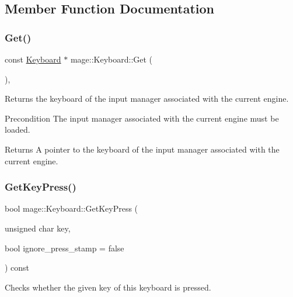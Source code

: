 \subsection{Member Function Documentation}
\hypertarget{classmage_1_1_keyboard_a696032d3a0d9bcf1a677a35e1e3d9aa8}{}\label{classmage_1_1_keyboard_a696032d3a0d9bcf1a677a35e1e3d9aa8} 
\subsubsection{\texorpdfstring{Get()}{Get()}}
{\footnotesize\ttfamily const \hyperlink{classmage_1_1_keyboard}{Keyboard} $\ast$ mage\+::\+Keyboard\+::\+Get (\begin{DoxyParamCaption}{ }\end{DoxyParamCaption})\hspace{0.3cm}{\ttfamily [static]}, {\ttfamily [noexcept]}}

Returns the keyboard of the input manager associated with the current engine.

\begin{DoxyPrecond}{Precondition}
The input manager associated with the current engine must be loaded. 
\end{DoxyPrecond}
\begin{DoxyReturn}{Returns}
A pointer to the keyboard of the input manager associated with the current engine. 
\end{DoxyReturn}
\hypertarget{classmage_1_1_keyboard_a94d35ad5ad27e3fc9496f3ab1fa28e4d}{}\label{classmage_1_1_keyboard_a94d35ad5ad27e3fc9496f3ab1fa28e4d} 
\subsubsection{\texorpdfstring{Get\+Key\+Press()}{GetKeyPress()}}
{\footnotesize\ttfamily bool mage\+::\+Keyboard\+::\+Get\+Key\+Press (\begin{DoxyParamCaption}\item[{unsigned char}]{key,  }\item[{bool}]{ignore\+\_\+press\+\_\+stamp = {\ttfamily false} }\end{DoxyParamCaption}) const}

Checks whether the given key of this keyboard is pressed.


